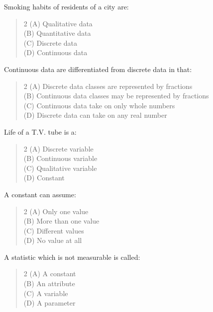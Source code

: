 \documentclass[11pt,a4paper]{article}
\begin{document}
\begin{mcqlist}
\item Smoking habits of residents of a city are:
\begin{quote}\begin{multicols}{2}
\noindent (A) Qualitative data \\
(B) Quantitative data \\
(C) Discrete data \\
(D) Continuous data
\end{multicols}\end{quote}

\item Continuous data are differentiated from discrete data in that:
\begin{quote}\begin{multicols}{2}
\noindent (A) Discrete data classes are represented by fractions \\
(B) Continuous data classes may be represented by fractions \\
(C) Continuous data take on only whole numbers \\
(D) Discrete data can take on any real number
\end{multicols}\end{quote}

\item Life of a T.V. tube is a:
\begin{quote}\begin{multicols}{2}
\noindent (A) Discrete variable \\
(B) Continuous variable \\
(C) Qualitative variable \\
(D) Constant
\end{multicols}\end{quote}

\item A constant can assume:
\begin{quote}\begin{multicols}{2}
\noindent (A) Only one value \\
(B) More than one value \\
(C) Different values \\
(D) No value at all
\end{multicols}\end{quote}

\item A statistic which is not measurable is called:
\begin{quote}\begin{multicols}{2}
\noindent (A) A constant \\
(B) An attribute \\
(C) A variable \\
(D) A parameter
\end{multicols}\end{quote}


\end{mcqlist}
\end{document}
